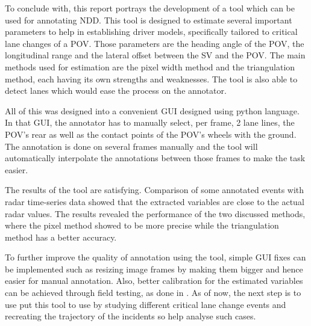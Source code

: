 To conclude with, this report portrays the development of a tool which can be used for annotating NDD. This tool is designed to estimate several important parameters to help in establishing driver models, specifically tailored to critical lane changes of a POV. Those parameters are the heading angle of the POV, the longitudinal range and the lateral offset between the SV and the POV. The main methods used for estimation are the pixel width method and the triangulation method, each having its own strengths and weaknesses. The tool is also able to detect lanes which would ease the process on the annotator. 

All of this was designed into a convenient GUI designed using python language. In that GUI, the annotator has to manually select, per frame, 2 lane lines, the POV's rear as well as the contact points of the POV's wheels with the ground. The annotation is done on several frames manually and the tool will automatically interpolate the annotations between those frames to make the task easier.

The results of the tool are satisfying. Comparison of some annotated events with radar time-series data showed that the extracted variables are close to the actual radar values. The results revealed the performance of the two discussed methods, where the pixel method showed to be more precise while the triangulation method has a better accuracy.

To further improve the quality of annotation using the tool, simple GUI fixes can be implemented such as resizing image frames by making them bigger and hence easier for manual annotation. Also, better calibration for the estimated variables can be achieved through field testing, as done in \cite{bargman2013using}. As of now, the next step is to use put this tool to use by studying different critical lane change events and recreating the trajectory of the incidents so help analyse such cases. 



